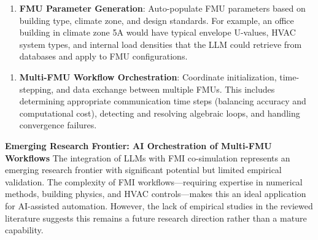 \documentclass[12pt,a4paper]{article}
\begin{document}
\begin{enumerate}[resume]
  \item \textbf{FMU Parameter Generation}: Auto-populate FMU parameters based on building type, climate zone, and design standards. For example, an office building in climate zone 5A would have typical envelope U-values, HVAC system types, and internal load densities that the LLM could retrieve from databases and apply to FMU configurations.
\end{enumerate}
\begin{enumerate}[resume]
  \item \textbf{Multi-FMU Workflow Orchestration}: Coordinate initialization, time-stepping, and data exchange between multiple FMUs. This includes determining appropriate communication time steps (balancing accuracy and computational cost), detecting and resolving algebraic loops, and handling convergence failures.
\end{enumerate}
\textbf{Emerging Research Frontier: AI Orchestration of Multi-FMU Workflows}
The integration of LLMs with FMI co-simulation represents an emerging research frontier with significant potential but limited empirical validation. The complexity of FMI workflows---requiring expertise in numerical methods, building physics, and HVAC controls---makes this an ideal application for AI-assisted automation. However, the lack of empirical studies in the reviewed literature suggests this remains a future research direction rather than a mature capability.
\end{document}
